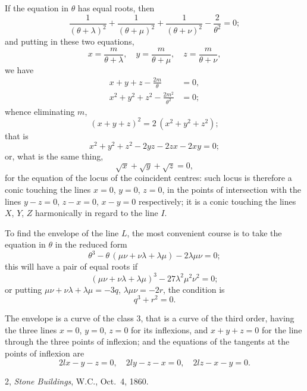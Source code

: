\documentclass[11pt,a4paper]{book}
\begin{document}
If the equation in $\theta$ has equal roots, then
\[
\frac{1}{(\theta+\lambda)^2} + \frac{1}{(\theta+\mu)^2} + \frac{1}{(\theta+\nu)^2} - \frac{2}{\theta^2} = 0;
\]
and putting in these two equations,
\[
x = \frac{m}{\theta+\lambda}, \quad y = \frac{m}{\theta+\mu}, \quad z = \frac{m}{\theta+\nu},
\]
we have
\begin{align*}
x + y + z - \frac{2m}{\theta} &= 0, \\
x^2 + y^2 + z^2 - \frac{2m^2}{\theta^2} &= 0;
\end{align*}
whence eliminating $m$,
\[
(x+y+z)^2 = 2\,(x^2+y^2+z^2);
\]
that is
\[
x^2 + y^2 + z^2 - 2yz - 2zx - 2xy = 0;
\]
or, what is the same thing,
\[
\surd x + \surd y + \surd z = 0,
\]
for the equation of the locus of the coincident centres: such locus is therefore a conic touching the lines $x=0$, $y=0$, $z=0$, in the points of intersection with the lines $y-z=0$, $z-x=0$, $x-y=0$ respectively; it is a conic touching the lines $X$, $Y$, $Z$ harmonically in regard to the line $I$.

To find the envelope of the line $L$, the most convenient course is to take the equation in $\theta$ in the reduced form
\[
\theta^3 - \theta\,(\mu\nu + \nu\lambda + \lambda\mu) - 2\lambda\mu\nu = 0;
\]
this will have a pair of equal roots if
\[
(\mu\nu + \nu\lambda + \lambda\mu)^3 - 27\lambda^2\mu^2\nu^2 = 0;
\]
or putting $\mu\nu + \nu\lambda + \lambda\mu = -3q$, $\lambda\mu\nu = -2r$, the condition is
\[
q^3 + r^2 = 0.
\]

The envelope is a curve of the class 3, that is a curve of the third order, having the three lines $x=0$, $y=0$, $z=0$ for its inflexions, and $x+y+z=0$ for the line through the three points of inflexion; and the equations of the tangents at the points of inflexion are
\[
2lx - y - z = 0, \quad 2ly - z - x = 0, \quad 2lz - x - y = 0.
\]

\begin{flushright}
2, \textit{Stone Buildings}, W.C., Oct.~4, 1860.
\end{flushright}


\end{document}
